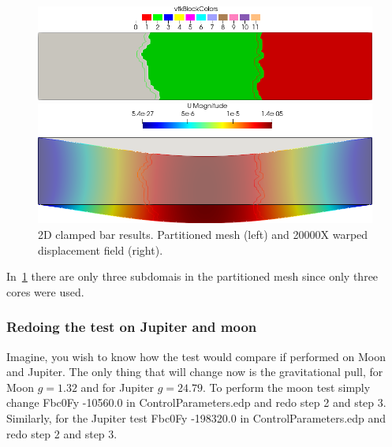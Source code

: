 \documentclass{report}
\begin{document}
\begin{figure}[htbp]
    \centering
    \begin{minipage}[t][2cm][t]{0.4\textwidth}
    \includegraphics[align=t,width=1\textwidth]{./Images/2d-bar-partitioned3.png}
    \end{minipage}\hspace{.1\textwidth}
    \begin{minipage}[t][2cm][t]{0.4\textwidth}
    \includegraphics[align=t,width=1\textwidth]{./Images/2d-bar-clamped-ends.png}
    \end{minipage}
    \caption{2D clamped bar results. Partitioned mesh (left) and 20000X warped displacement field (right).}
    \label{fig:3part}
\end{figure}

In~\cref{fig:3part} there are only three subdomais in the partitioned mesh since only three cores were used.

\subsubsection{Redoing the test on Jupiter and moon}

Imagine, you wish to know how the test would compare if performed on Moon and Jupiter. The only thing that will change now is the gravitational pull, for Moon $g=1.32$ and for Jupiter $g=24.79$. To perform the moon test simply change  {\ttfamily Fbc0Fy -10560.0} in {\ttfamily ControlParameters.edp} and redo step 2 and step 3. Similarly, for the Jupiter test {\ttfamily Fbc0Fy -198320.0} in {\ttfamily ControlParameters.edp} and redo step 2 and step 3.
\end{document}
